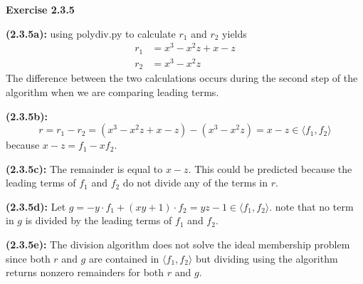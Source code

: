 \documentclass[12pt,oneside]{article}
\newenvironment{exercise}[1]{\vspace{.1in}\noindent\textbf{Exercise #1 \hspace{.05em}}}{}
\begin{document}
\begin{exercise}{2.3.5}

    \bigskip
    \textbf{(2.3.5a):}
    using poly\textunderscore div.py to calculate $r_1$ and $r_2$ yields 
    \begin{align*}
        r_1 &= x^3-x^2z+x-z\\
        r_2 &= x^3-x^2z
    \end{align*}
    The difference between the two calculations occurs during the second 
    step of the algorithm when we are comparing leading terms.

    \bigskip
    \textbf{(2.3.5b):}
    \[
        r = r_1-r_2 = (x^3-x^2z+x-z)-(x^3-x^2z)=x-z \in \langle f_1, f_2 \rangle   
    \]
    because $x-z = f_1-xf_2$.

    \bigskip
    \textbf{(2.3.5c):}
    The remainder is equal to $x-z$. This could be predicted because the 
    leading terms of $f_1$ and $f_2$ do not divide any of the terms in $r$.

    \bigskip
    \textbf{(2.3.5d):}
    Let $g=-y\cdot f_1+(xy+1)\cdot f_2 = yz-1 \in \langle f_1, f_2 \rangle$. 
    note that no term in $g$ is divided by the leading terms of $f_1$ and $f_2$.

    \bigskip
    \textbf{(2.3.5e):}
    The division algorithm does not solve the ideal membership problem since 
    both $r$ and $g$ are contained in $\langle f_1, f_2 \rangle$ but dividing 
    using the algorithm returns nonzero remainders for both $r$ and $g$.

\end{exercise}


\end{document}
